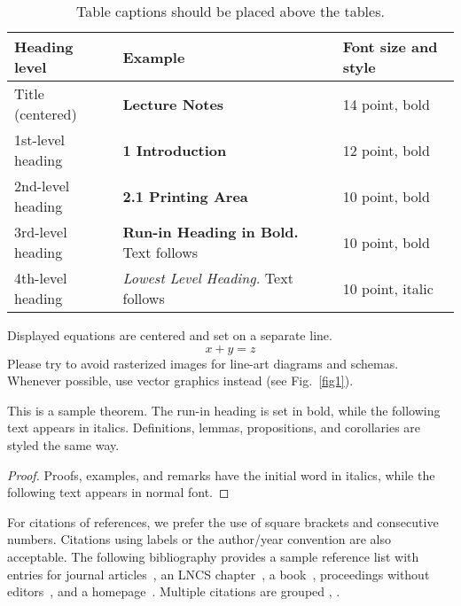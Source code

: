 \documentclass[runningheads]{llncs}
\begin{document}
\begin{table}
\caption{Table captions should be placed above the
tables.}\label{tab1}
\begin{tabular}{|l|l|l|}
\hline
Heading level &  Example & Font size and style\\
\hline
Title (centered) &  {\Large\bfseries Lecture Notes} & 14 point, bold\\
1st-level heading &  {\large\bfseries 1 Introduction} & 12 point, bold\\
2nd-level heading & {\bfseries 2.1 Printing Area} & 10 point, bold\\
3rd-level heading & {\bfseries Run-in Heading in Bold.} Text follows & 10 point, bold\\
4th-level heading & {\itshape Lowest Level Heading.} Text follows & 10 point, italic\\
\hline
\end{tabular}
\end{table}


\noindent Displayed equations are centered and set on a separate
line.
\begin{equation}
x + y = z
\end{equation}
Please try to avoid rasterized images for line-art diagrams and
schemas. Whenever possible, use vector graphics instead (see
Fig.~\ref{fig1}).


\begin{theorem}
This is a sample theorem. The run-in heading is set in bold, while
the following text appears in italics. Definitions, lemmas,
propositions, and corollaries are styled the same way.
\end{theorem}
%
%
\begin{proof}
Proofs, examples, and remarks have the initial word in italics,
while the following text appears in normal font.
\end{proof}
For citations of references, we prefer the use of square brackets
and consecutive numbers. Citations using labels or the author/year
convention are also acceptable. The following bibliography provides
a sample reference list with entries for journal
articles~\cite{ref_article1}, an LNCS chapter~\cite{ref_lncs1}, a
book~\cite{ref_book1}, proceedings without editors~\cite{ref_proc1},
and a homepage~\cite{ref_url1}. Multiple citations are grouped
\cite{ref_article1,ref_lncs1,ref_book1},
\cite{ref_article1,ref_book1,ref_proc1,ref_url1}.
\end{document}
